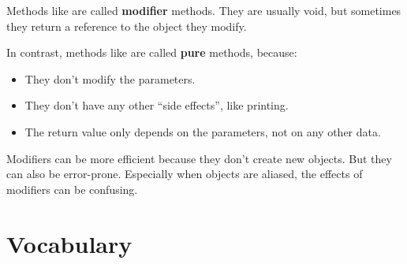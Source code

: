 
Methods like  are called {\bf modifier} methods.
They are usually void, but sometimes they return a reference to the object they modify.


In contrast, methods like  are called {\bf pure} methods, because:

\begin{itemize}

\item They don't modify the parameters.

\item They don't have any other ``side effects'', like printing.

\item The return value only depends on the parameters, not on any other 
data.

\end{itemize}

Modifiers can be more efficient because they don't create new objects.
But they can also be error-prone.
Especially when objects are aliased, the effects of modifiers can be confusing.




\section{Vocabulary}

